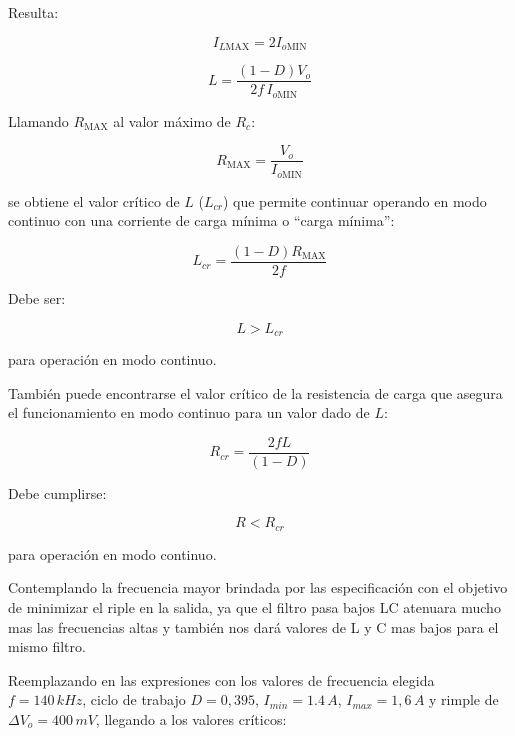 \documentclass[]{article}
\begin{document}
	Resulta:
	
	\begin{equation}
		I_{L\text{MAX}} = 2I_{o\text{MIN}}
	\end{equation}
	
	\begin{equation}
		L = \frac{(1-D)V_o}{2f\,I_{o\text{MIN}}}
	\end{equation}
	
	Llamando \(R_{\text{MAX}}\) al valor máximo de \(R_c\):
	
	\begin{equation}
		R_{\text{MAX}} = \frac{V_o}{I_{o\text{MIN}}}
	\end{equation}
	
	se obtiene el valor crítico de \(L\) (\(L_{cr}\)) que permite continuar operando en modo continuo con una corriente de carga mínima o “carga mínima”:
	
	\begin{equation}
		L_{cr} = \frac{(1-D)R_{\text{MAX}}}{2f}
	\end{equation}
	
	Debe ser:
	
	\begin{equation}
		L > L_{cr}
	\end{equation}
	
	para operación en modo continuo.
	
	También puede encontrarse el valor crítico de la resistencia de carga que asegura el funcionamiento en modo continuo para un valor dado de \(L\):
	
	\begin{equation}
		R_{cr} = \frac{2fL}{(1-D)}
	\end{equation}
	
	Debe cumplirse:
	
	\begin{equation}
		R < R_{cr}
	\end{equation}
	
	para operación en modo continuo.
	
	Contemplando la frecuencia mayor brindada por las especificación con el objetivo de minimizar el riple en la salida, ya que el filtro pasa bajos LC atenuara mucho mas las frecuencias altas y también nos dará valores de L y C mas bajos para el mismo filtro.
	
	Reemplazando en las expresiones con los valores de frecuencia elegida $f = 140 \, kHz$, ciclo de trabajo $D = 0,395$, $I_{min} = 1.4 \, A$, $I_{max} = 1,6 \,A$ y rimple de $\Delta V_o = 400 \, mV$, llegando a los valores críticos: 
	
\end{document}
